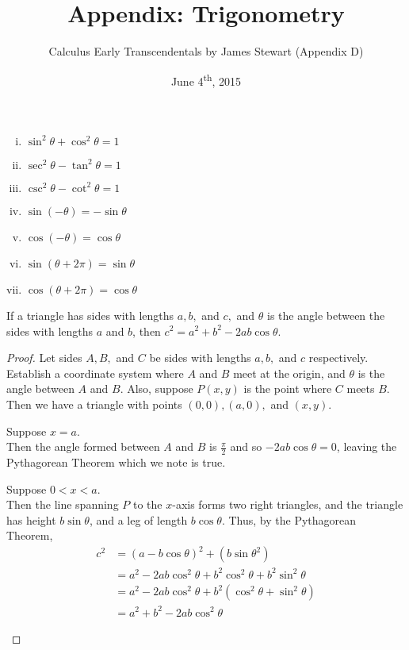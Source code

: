 \documentclass[a4paper,11pt]{article}
\title{Appendix: Trigonometry}
\author{Calculus Early Transcendentals by James Stewart (Appendix D)}
\date{June 4\textsuperscript{th}, 2015}
\begin{document}
\maketitle
{}

\begin{outline}

    \begin{enumerate}[i.]
      \item \(\sin^2\theta + \cos^2\theta = 1\)
      \item \(\sec^2\theta - \tan^2\theta = 1\)
      \item \(\csc^2\theta - \cot^2\theta = 1\)
      \item \(\sin{(-\theta)} = -\sin{\theta}\)
      \item \(\cos{(-\theta)} = \cos{\theta}\)
      \item \(\sin{(\theta + 2\pi)} = \sin{\theta}\)
      \item \(\cos{(\theta + 2\pi)} = \cos{\theta}\)
    \end{enumerate}
    
    If a triangle has sides with lengths \(a, b,\) and \(c,\) and \(\theta\) is the angle between the sides
    with lengths \(a\) and \(b\), then \(c^2 = a^2 + b^2 - 2ab\cos{\theta}\).
    
    \begin{proof}
      Let sides \(A, B,\) and \(C\) be sides with lengths \(a, b,\) and \(c\) respectively. Establish a coordinate 
      system where \(A\) and \(B\) meet at the origin, and \(\theta\) is the angle between \(A\) and \(B\). Also, 
      suppose \(P(x, y)\) is the point where \(C\) meets \(B\). Then we have a triangle with points \((0, 0), (a, 0),\)
      and \((x, y)\).
      
      \begin{proofcases}
        \item
          Suppose \(x = a\).\\
          Then the angle formed between \(A\) and \(B\) is \(\frac{\pi}{2}\) and so \(-2ab\cos{\theta} = 0\),
          leaving the Pythagorean Theorem which we note is true.
        \item
          Suppose \(0 < x < a\).\\
          Then the line spanning \(P\) to the \(x\)-axis forms two right triangles, and the triangle has height
          \(b\sin{\theta}\), and a leg of length \(b\cos{\theta}\). Thus, by the Pythagorean Theorem,
          \begin{align*}
            c^2 &= (a-b\cos{\theta})^2 + (b\sin{\theta}^2) \\
                &= a^2 - 2ab\cos^2{\theta} + b^2\cos^2{\theta} + b^2\sin^2{\theta}\\
                &= a^2 - 2ab\cos^2{\theta} + b^2(\cos^2{\theta} + \sin^2{\theta}) \\
                &= a^2 + b^2 - 2ab\cos^2{\theta}
          \end{align*}
      \end{proofcases}
    \end{proof}
    

\end{outline}
\end{document}
